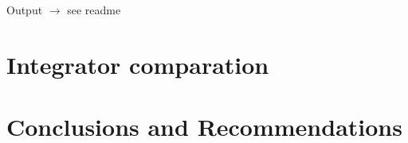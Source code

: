 \documentclass[12pt, letterpaper]{article}
\begin{document}
Output $\rightarrow$ see readme


\section{Integrator comparation}
\label{Integrator_comparation}


\section{Conclusions and Recommendations}
\label{conclusions_recommandations}








\end{document}
